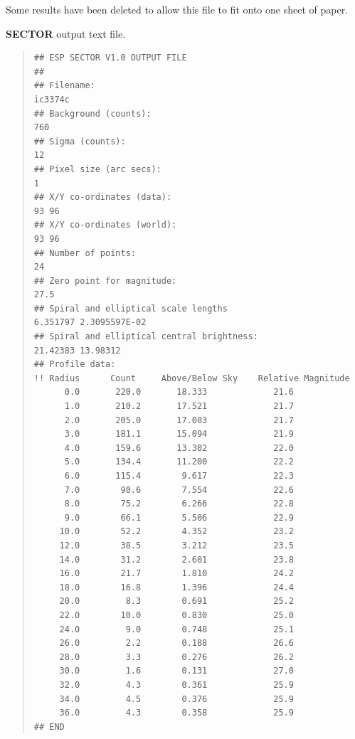 \documentclass[twoside,11pt]{article}
\newenvironment{myquote}{\begin{quote}\begin{small}}{\end{small}\end{quote}}
\begin{document}
Some results have been deleted to allow this file to fit onto
one sheet of paper.

\newpage
\textbf{SECTOR} output text file.

\begin{myquote}
\begin{verbatim}
## ESP SECTOR V1.0 OUTPUT FILE 
##
## Filename: 
ic3374c                                                   
## Background (counts):
760
## Sigma (counts):
12
## Pixel size (arc secs):
1
## X/Y co-ordinates (data):
93 96
## X/Y co-ordinates (world):
93 96
## Number of points:
24
## Zero point for magnitude:
27.5
## Spiral and elliptical scale lengths 
6.351797 2.3095597E-02
## Spiral and elliptical central brightness:
21.42383 13.98312
## Profile data:
!! Radius      Count     Above/Below Sky    Relative Magnitude 
      0.0       220.0       18.333             21.6                             
      1.0       210.2       17.521             21.7                             
      2.0       205.0       17.083             21.7                             
      3.0       181.1       15.094             21.9                             
      4.0       159.6       13.302             22.0                             
      5.0       134.4       11.200             22.2                             
      6.0       115.4        9.617             22.3                             
      7.0        90.6        7.554             22.6                             
      8.0        75.2        6.266             22.8                             
      9.0        66.1        5.506             22.9                             
     10.0        52.2        4.352             23.2                             
     12.0        38.5        3.212             23.5                             
     14.0        31.2        2.601             23.8                             
     16.0        21.7        1.810             24.2                             
     18.0        16.8        1.396             24.4                             
     20.0         8.3        0.691             25.2                             
     22.0        10.0        0.830             25.0                             
     24.0         9.0        0.748             25.1                             
     26.0         2.2        0.188             26.6                             
     28.0         3.3        0.276             26.2                             
     30.0         1.6        0.131             27.0                             
     32.0         4.3        0.361             25.9                             
     34.0         4.5        0.376             25.9                             
     36.0         4.3        0.358             25.9                             
## END 
\end{verbatim}
\end{myquote}
\end{document}

